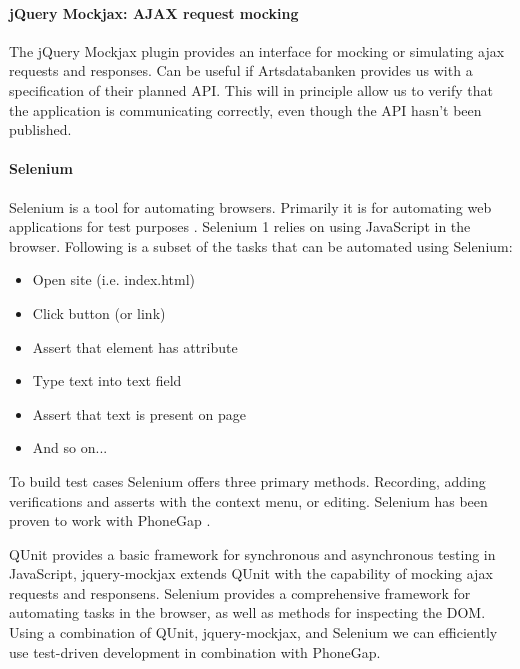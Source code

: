     \paragraph{jQuery Mockjax: AJAX request mocking}
	The jQuery Mockjax plugin provides an interface for mocking or simulating
	ajax requests and responses. \cite{github:jquery-mockjax} Can be useful if Artsdatabanken provides us
	with a specification of their planned API. This will in principle allow us
	to verify that the application is communicating correctly, even though the
	API hasn't been published.

    \paragraph{Selenium}
	Selenium is a tool for automating browsers. Primarily it is for automating
	web applications for test purposes \cite{seleniumhq:home}. Selenium 1 relies
	on using JavaScript in the browser. Following is a subset of the tasks that
	can be automated using Selenium:

	\begin{itemize}
		\item Open site (i.e. index.html)
		\item Click button (or link)
		\item Assert that element has attribute
		\item Type text into text field
		\item Assert that text is present on page
		\item And so on...
	\end{itemize}

	To build test cases Selenium offers three primary methods. Recording, adding
	verifications and asserts with the context menu, or editing. Selenium has
	been proven to work with PhoneGap \cite{phonegap:automatic-test-cases}.\newline\newline


	QUnit provides a basic framework for synchronous and asynchronous testing in
	JavaScript, jquery-mockjax extends QUnit with the capability of mocking ajax
	requests and responsens. Selenium provides a comprehensive framework for
	automating tasks in the browser, as well as methods for inspecting the DOM.
	Using a combination of QUnit, jquery-mockjax, and Selenium we can
	efficiently use test-driven development in combination with PhoneGap.
